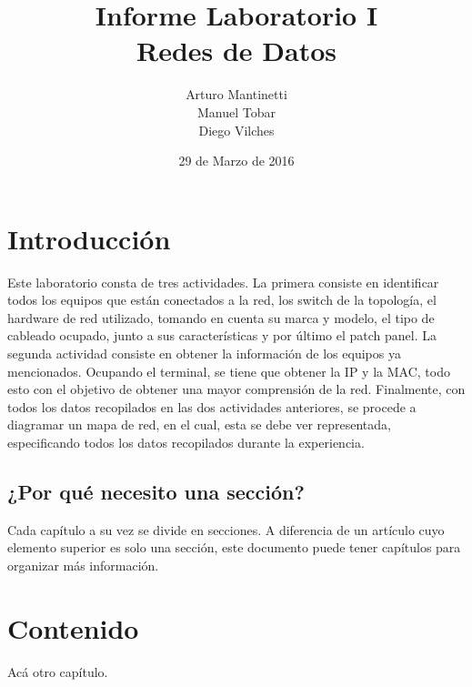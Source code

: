 \documentclass[spanish]{udpreport}
\title{Informe Laboratorio I \\ Redes de Datos}
\author{Arturo Mantinetti \\ Manuel Tobar \\ Diego Vilches}
\date{29 de Marzo de 2016}
\begin{document}
\maketitle

\tableofcontents

\chapter{Introducción}

Este laboratorio consta de tres actividades. La primera consiste en identificar todos los equipos que están conectados a la red, los switch de la topología, el hardware de red utilizado, tomando en cuenta su marca y modelo, el tipo de cableado ocupado, junto a sus características y por último el patch panel. La segunda actividad consiste en obtener la información de los equipos ya mencionados. Ocupando el terminal, se tiene que obtener la IP y la MAC, todo esto con el objetivo de obtener una mayor comprensión de la red. Finalmente, con todos los datos recopilados en las dos actividades anteriores, se procede a diagramar un mapa de red, en el cual, esta se debe ver representada,  especificando todos los datos recopilados durante la experiencia.

\section{¿Por qué necesito una sección?}

Cada capítulo a su vez se divide en secciones. A diferencia de un artículo cuyo elemento superior es solo una sección, este documento puede tener capítulos para organizar más información.

\chapter{Contenido}

Acá otro capítulo.

\listoffigures
\end{document}
